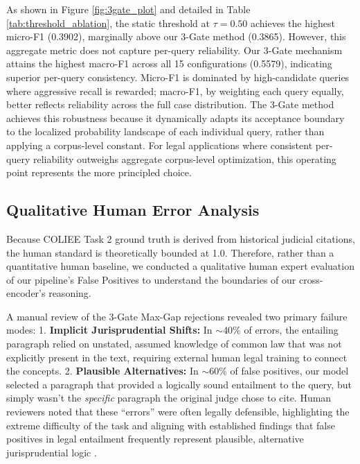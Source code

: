 \documentclass[sigconf]{acmart}
\newcommand{\rev}[1]{{\color{blue}#1}}
\begin{document}
\rev{As shown in Figure \ref{fig:3gate_plot} and detailed in Table \ref{tab:threshold_ablation}, the static threshold at $\tau = 0.50$ achieves the highest micro-F1 (0.3902), marginally above our 3-Gate method (0.3865). However, this aggregate metric does not capture per-query reliability. Our 3-Gate mechanism attains the highest macro-F1 across all 15 configurations (0.5579), indicating superior per-query consistency. Micro-F1 is dominated by high-candidate queries where aggressive recall is rewarded; macro-F1, by weighting each query equally, better reflects reliability across the full case distribution. The 3-Gate method achieves this robustness because it dynamically adapts its acceptance boundary to the localized probability landscape of each individual query, rather than applying a corpus-level constant. For legal applications where consistent per-query reliability outweighs aggregate corpus-level optimization, this operating point represents the more principled choice.}


\subsection{Qualitative Human Error Analysis}
Because COLIEE Task 2 ground truth is derived from historical judicial citations, the human standard is theoretically bounded at 1.0. Therefore, rather than a quantitative human baseline, we conducted a qualitative human expert evaluation of our pipeline's False Positives to understand the boundaries of our cross-encoder's reasoning. 

A manual review of the 3-Gate Max-Gap rejections revealed two primary failure modes:
1. \textbf{Implicit Jurisprudential Shifts:} In $\sim$40\% of errors, the entailing paragraph relied on unstated, assumed knowledge of common law that was not explicitly present in the text, requiring external human legal training to connect the concepts.
2. \textbf{Plausible Alternatives:} In $\sim$60\% of false positives, our model selected a paragraph that provided a logically sound entailment to the query, but simply wasn't the \textit{specific} paragraph the original judge chose to cite. Human reviewers noted that these ``errors'' were often legally defensible, highlighting the extreme difficulty of the task and aligning with established findings that false positives in legal entailment frequently represent plausible, alternative jurisprudential logic \cite{zheng2021when, zhang2025do}. 
\end{document}
